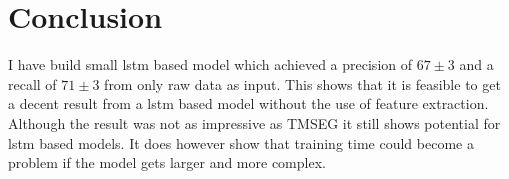 \section{Conclusion}

I have build small \gls{lstm} based model which achieved a precision of 
$67 \pm 3$ and a recall of $71 \pm 3$ from only raw data as input.
This shows that it is feasible to get a decent result from a 
\gls{lstm} based model without the use of feature extraction.
Although the result was not as impressive as TMSEG it still shows 
potential for \gls{lstm} based models. It does however show that
training time could become a problem if the model gets larger and more 
complex. 